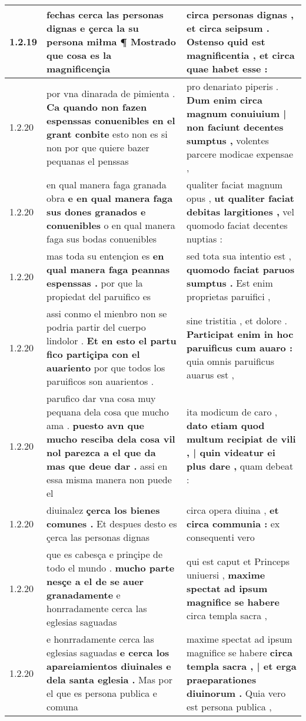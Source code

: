 \begin{tabular}{|p{1cm}|p{6.5cm}|p{6.5cm}|}
1.2.19 & fechas cerca las personas dignas \textbf{ e çerca la su persona miłma ¶ } Mostrado que cosa es la magnificençia & circa personas dignas , \textbf{ et circa seipsum . Ostenso quid est magnificentia , } et circa quae habet esse : \\\hline
1.2.20 & por vna dinarada de pimienta . \textbf{ Ca quando non fazen espenssas conuenibles en el grant conbite } esto non es si non por que quiere bazer pequanas el penssas & pro denariato piperis . \textbf{ Dum enim circa magnum conuiuium | non faciunt decentes sumptus , } volentes parcere modicae expensae , \\\hline
1.2.20 & en qual manera faga granada obra \textbf{ e en qual manera faga sus dones granados e conuenibles } o en qual manera faga sus bodas conuenibles & qualiter faciat magnum opus , \textbf{ ut qualiter faciat debitas largitiones , } vel quomodo faciat decentes nuptias : \\\hline
1.2.20 & mas toda su entençion es \textbf{ en qual manera faga peannas espenssas . } por que la propiedat del paruifico es & sed tota sua intentio est , \textbf{ quomodo faciat paruos sumptus . } Est enim proprietas paruifici , \\\hline
1.2.20 & assi conmo el mienbro non se podria partir del cuerpo lindolor . \textbf{ Et en esto el partu fico partiçipa con el auariento } por que todos los paruificos son auarientos . & sine tristitia , et dolore . \textbf{ Participat enim in hoc paruificus cum auaro : } quia omnis paruificus auarus est , \\\hline
1.2.20 & parufico dar vna cosa muy pequana dela cosa que mucho ama . \textbf{ puesto avn que mucho resciba dela cosa vil nol parezca a el que da mas que deue dar . } assi en essa misma manera non puede el & ita modicum de caro , \textbf{ dato etiam quod multum recipiat de vili , | quin videatur ei plus dare , } quam debeat : \\\hline
1.2.20 & diuinalez \textbf{ çerca los bienes comunes . } Et despues desto es çerca las personas dignas & circa opera diuina , \textbf{ et circa communia : } ex consequenti vero \\\hline
1.2.20 & que es cabesça e prinçipe de todo el mundo . \textbf{ mucho parte nesçe a el de se auer granadamente } e honrradamente cerca las eglesias saguadas & qui est caput et Princeps uniuersi , \textbf{ maxime spectat ad ipsum magnifice se habere } circa templa sacra , \\\hline
1.2.20 & e honrradamente cerca las eglesias saguadas \textbf{ e cerca los apareiamientos diuinales e dela santa eglesia . } Mas por el que es persona publica e comuna & maxime spectat ad ipsum magnifice se habere \textbf{ circa templa sacra , | et erga praeparationes diuinorum . } Quia vero est persona publica , \\\hline

\end{tabular}
